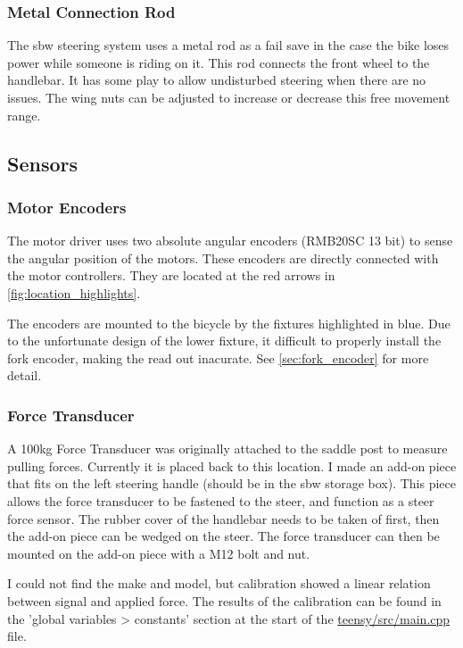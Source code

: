 \subsubsection{Metal Connection Rod}
The sbw steering system uses a metal rod as a fail save in the case the bike loses power while someone is riding on it. 
This rod connects the front wheel to the handlebar. 
It has some play to allow undisturbed steering when there are no issues. 
The wing nuts can be adjusted to increase or decrease this free movement range.



\subsection{Sensors}
\subsubsection{Motor Encoders}
The motor driver uses two absolute angular encoders (RMB20SC 13 bit) to sense the angular position of the motors.
These encoders are directly connected with the motor controllers.
They are located at the red arrows in \autoref{fig:location_highlights}.

The encoders are mounted to the bicycle by the fixtures highlighted in blue.
Due to the unfortunate design of the lower fixture, it difficult to properly install the fork encoder, making the read out inacurate.
See \autoref{sec:fork_encoder} for more detail.

\subsubsection{Force Transducer}
A 100kg Force Transducer was originally attached to the saddle post to measure pulling forces. 
Currently it is placed back to this location.
I made an add-on piece that fits on the left steering handle (should be in the sbw storage box).
This piece allows the force transducer to be fastened to the steer, and function as a steer force sensor.
The rubber cover of the handlebar needs to be taken of first, then the add-on piece can be wedged on the steer. 
The force transducer can then be mounted on the add-on piece with a M12 bolt and nut.

I could not find the make and model, but calibration showed a linear relation between signal and applied force.
The results of the calibration can be found in the 'global variables > constants' section at the start of the \href{https://github.com/mechmotum/sbw_bicycle_with_model_matching/tree/master/teensy/src}{teensy/src/main.cpp} file.

